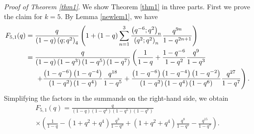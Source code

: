 \documentclass[12pt,reqno]{amsart}
\renewcommand{\(}{\left\(}
\renewcommand{\)}{\right\)}
\numberwithin{equation}{section}
\theoremstyle{plain}
\theoremstyle{definition}
\numberwithin{equation}{section}
\begin{document}
\noindent \emph{Proof of Theorem \ref{thm1}}. We show Theorem \ref{thm1} in three parts. First we prove the claim for $k=5$. By Lemma \ref{newlem1}, we have
\begin{align*}
F_{5,1}(q)&=\frac{q}{\left(1-q\right)\left(q;q^2\right)_{4}}\left(1+\left(1-q\right)\sum_{n=1 }^{3}\frac{\left(q^{-6};q^2\right)_n}{\left(q^2;q^2\right)_n}\frac{q^{9n}}{1-q^{2n+1}}\right)  \\    
&= \frac{q}{(1-q)\left(1-q^3\right)\left(1-q^5\right)\left(1-q^7\right)}  \left(\frac{1}{1-q}+\frac{1-q^{-6}}{1-q^2}\frac{q^9}{1-q^3} \right.\\
&\hspace{.5cm}\left. +\frac{\left(1-q^{-6}\right)\left(1-q^{-4}\right)}{\left(1-q^2\right)\left(1-q^4\right)}\frac{q^{18}}{1-q^5}+\frac{\left(1-q^{-6}\right)\left(1-q^{-4}\right)\left(1-q^{-2}\right)}{\left(1-q^2\right)\left(1-q^4\right)\left(1-q^6\right)}\frac{q^{27}}{1-q^7}\right).
\end{align*}
Simplifying the factors in the summands on the right-hand side, we obtain
\begin{multline*}
F_{5,1}(q)=\frac{q}{(1-q)\left(1-q^3\right)\left(1-q^5\right)\left(1-q^7\right)} \\ \times\left(\frac{1}{1-q}-\left(1+q^2+q^4\right)\frac{q^3}{1-q^3}+\left(1+q^2+q^4\right)\frac{q^8}{1-q^5}-\frac{q^{15}}{1-q^7}\right).
\end{multline*}
\end{document}
